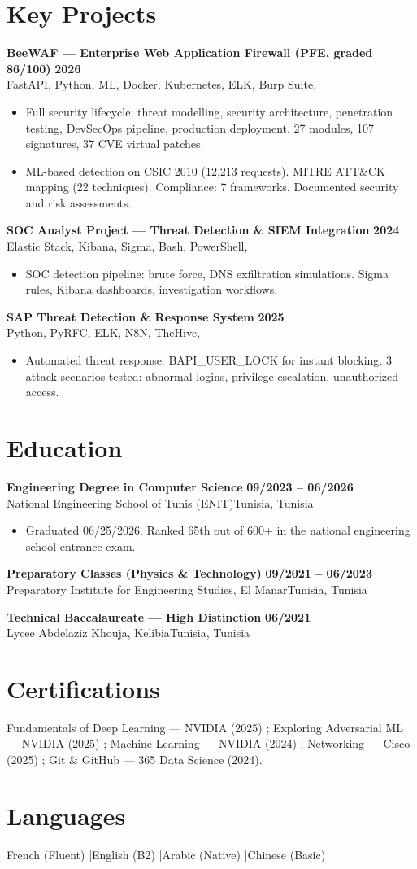 \documentclass[a4paper,9pt]{article}
\newcommand{\cventry}[4]{\textbf{#1} \hfill \textbf{#4}\\[0.2pt]#2{\ifx\relax#3\relax\else, #3\fi}\par\vspace{0.3pt}}
\begin{document}
\section{Key Projects}
\cventry{BeeWAF --- Enterprise Web Application Firewall (PFE, graded 86/100)}{FastAPI, Python, ML, Docker, Kubernetes, ELK, Burp Suite}{}{2026}
\begin{itemize}
  \item Full security lifecycle: threat modelling, security architecture, penetration testing, DevSecOps pipeline, production deployment. 27 modules, 107 signatures, 37 CVE virtual patches.
  \item ML-based detection on CSIC 2010 (12,213 requests). MITRE ATT\&CK mapping (22 techniques). Compliance: 7 frameworks. Documented security and risk assessments.
\end{itemize}
\cventry{SOC Analyst Project --- Threat Detection \& SIEM Integration}{Elastic Stack, Kibana, Sigma, Bash, PowerShell}{}{2024}
\begin{itemize}
  \item SOC detection pipeline: brute force, DNS exfiltration simulations. Sigma rules, Kibana dashboards, investigation workflows.
\end{itemize}
\cventry{SAP Threat Detection \& Response System}{Python, PyRFC, ELK, N8N, TheHive}{}{2025}
\begin{itemize}
  \item Automated threat response: BAPI\_USER\_LOCK for instant blocking. 3 attack scenarios tested: abnormal logins, privilege escalation, unauthorized access.
\end{itemize}
\section{Education}
\cventry{Engineering Degree in Computer Science}{National Engineering School of Tunis (ENIT)}{Tunisia}{09/2023 -- 06/2026}
\begin{itemize}
  \item Graduated 06/25/2026. Ranked 65th out of 600+ in the national engineering school entrance exam.
\end{itemize}
\cventry{Preparatory Classes (Physics \& Technology)}{Preparatory Institute for Engineering Studies, El Manar}{Tunisia}{09/2021 -- 06/2023}
\cventry{Technical Baccalaureate --- High Distinction}{Lycee Abdelaziz Khouja, Kelibia}{Tunisia}{06/2021}
\section{Certifications}
Fundamentals of Deep Learning --- NVIDIA (2025) ; Exploring Adversarial ML --- NVIDIA (2025) ; Machine Learning --- NVIDIA (2024) ; Networking --- Cisco (2025) ; Git \& GitHub --- 365 Data Science (2024).
\section{Languages}
French (Fluent) \quad|\quad English (B2) \quad|\quad Arabic (Native) \quad|\quad Chinese (Basic)
\end{document}
